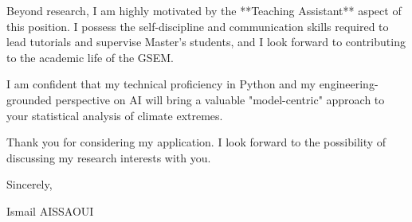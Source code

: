 \documentclass[11pt,a4paper]{article}
\begin{document}
Beyond research, I am highly motivated by the **Teaching Assistant** aspect of this position. I possess the self-discipline and communication skills required to lead tutorials and supervise Master’s students, and I look forward to contributing to the academic life of the GSEM.

I am confident that my technical proficiency in Python and my engineering-grounded perspective on AI will bring a valuable "model-centric" approach to your statistical analysis of climate extremes.

Thank you for considering my application. I look forward to the possibility of discussing my research interests with you.

Sincerely,

\bigskip

\noindent Ismail AISSAOUI
\end{document}
